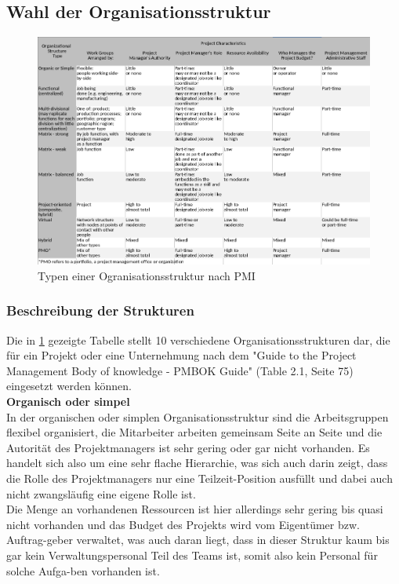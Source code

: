 \documentclass[ThesisDJ.tex]{subfiles}
\begin{document}
  \subsection{Wahl der Organisationsstruktur}

\begin{figure}[ht]
    \hspace{-0.5cm}
    \includegraphics[width=40pc]{./Organisationsstrukturen.png}
    \caption{Typen einer Ogranisationsstruktur nach PMI\cite{PMI2017PMBOK}}
    \label{fig:orgstrukturen}
\end{figure} 

\subsubsection{Beschreibung der Strukturen}

Die in \ref{fig:orgstrukturen} gezeigte Tabelle stellt 10 verschiedene Organisationsstrukturen dar, die für ein Projekt oder eine Unternehmung nach dem "Guide to the Project Management Body of knowledge - PMBOK Guide" (Table 2.1, Seite 75) eingesetzt werden können.\cite{PMI2017PMBOK} \smallskip\\

\textbf{Organisch oder simpel}\\
In der organischen oder simplen Organisationsstruktur sind die Arbeitsgruppen flexibel organisiert, die Mitarbeiter arbeiten gemeinsam Seite an Seite und die Autorität des Projektmanagers ist sehr gering oder gar nicht vorhanden. Es handelt sich also um eine sehr flache Hierarchie, was sich auch darin zeigt, dass die Rolle des Projektmanagers nur eine Teilzeit-Position ausfüllt und dabei auch nicht zwangsläufig eine eigene Rolle ist.\\
Die Menge an vorhandenen Ressourcen ist hier allerdings sehr gering bis quasi nicht vorhanden und das Budget des Projekts wird vom Eigentümer bzw. Auftrag-geber verwaltet, was auch daran liegt, dass in dieser Struktur kaum bis gar kein Verwaltungspersonal Teil des Teams ist, somit also kein Personal für solche Aufga-ben vorhanden ist. \medskip\\
\end{document}

